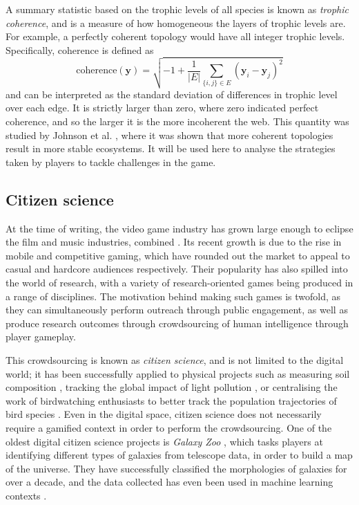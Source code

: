 A summary statistic based on the trophic levels of all species is known as \emph{trophic coherence}, and is a measure of how homogeneous the layers of trophic levels are. For example, a perfectly coherent topology would have all integer trophic levels. Specifically, coherence is defined as
\begin{equation}
  \mathrm{coherence}(\mathbf{y}) = \sqrt{ -1 + \frac{1}{|E|}\sum_{\{i,j\}\in E}(\mathbf{y}_i - \mathbf{y}_j)^2}
  \label{eq:coherence}
\end{equation}
and can be interpreted as the standard deviation of differences in trophic level over each edge. It is strictly larger than zero, where zero indicated perfect coherence, and so the larger it is the more incoherent the web.
This quantity was studied by Johnson et al. \cite{Johnson2014}, where it was shown that more coherent topologies result in more stable ecosystems. It will be used here to analyse the strategies taken by players to tackle challenges in the game.

\subsection{Citizen science}
\label{sec:citizen_science}
At the time of writing, the video game industry has grown large enough to eclipse the film and music industries, combined \cite{Egenfeldt-Nielsen2019}. Its recent growth is due to the rise in mobile and competitive gaming, which have rounded out the market to appeal to casual and hardcore audiences respectively.
Their popularity has also spilled into the world of research, with a variety of research-oriented games being produced in a range of disciplines. The motivation behind making such games is twofold, as they can simultaneously perform outreach through public engagement, as well as produce research outcomes through crowdsourcing of human intelligence through player gameplay.

This crowdsourcing is known as \emph{citizen science}, and is not limited to the digital world; it has been successfully applied to physical projects such as measuring soil composition \cite{Rossiter2015}, tracking the global impact of light pollution \cite{Cui2020}, or centralising the work of birdwatching enthusiasts to better track the population trajectories of bird species \cite{Link2008}.
Even in the digital space, citizen science does not necessarily require a gamified context in order to perform the crowdsourcing. One of the oldest digital citizen science projects is \emph{Galaxy Zoo} \cite{Masters2019}, which tasks players at identifying different types of galaxies from telescope data, in order to build a map of the universe. They have successfully classified the morphologies of galaxies for over a decade, and the data collected has even been used in machine learning contexts \cite{Walmsley2020}.

